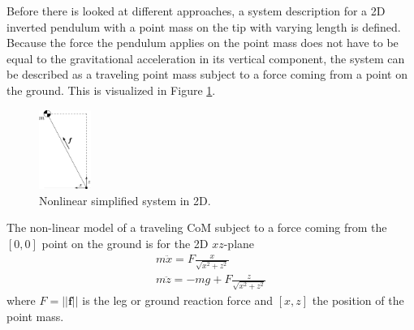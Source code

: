 Before there is looked at different approaches, a system description for a \ac{2D} inverted pendulum with a point mass on the tip with varying length is defined. Because the force the pendulum applies on the point mass does not have to be equal to the gravitational acceleration in its vertical component, the system can be described as a traveling point mass subject to a force coming from a point on the ground. This is visualized in Figure \ref{fig:2dnonlin}.
\begin{figure}[h]
\centering
\includegraphics[width=0.15\textwidth]{STYLESTUFF/2Dnonlin.png}
\caption{Nonlinear simplified system in \ac{2D}.}
\label{fig:2dnonlin}
\end{figure} 

The non-linear model of a traveling \ac{CoM} subject to a force coming from the $[0,0]$ point on the ground is for the \ac{2D} $xz$-plane
\begin{eqnarray}
m\ddot{x} = F \frac{x}{\sqrt{x^2+z^2}}\\
m\ddot{z} = -mg+F \frac{z}{\sqrt{x^2+z^2}}
\label{eq:nonlindyn}
\end{eqnarray} 
where $F=||\boldsymbol{f}||$ is the leg or ground reaction force and $[x,z]$ the position of the point mass.


